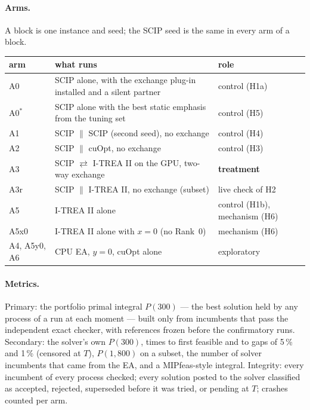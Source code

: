 \paragraph{Arms.} A block is one instance and seed; the SCIP seed is the same in every arm of a block.
\begin{center}\small
\begin{tabular}{lll}
\toprule
arm & what runs & role \\
\midrule
A0 & SCIP alone, with the exchange plug-in installed and a silent partner & control (H1a) \\
A0$^*$ & SCIP alone with the best static emphasis from the tuning set & control (H5) \\
A1 & SCIP $\parallel$ SCIP (second seed), no exchange & control (H4) \\
A2 & SCIP $\parallel$ cuOpt, no exchange & control (H3) \\
A3 & SCIP $\rightleftarrows$ I-TREA II on the GPU, two-way exchange & \textbf{treatment} \\
A3r & SCIP $\parallel$ I-TREA II, no exchange (subset) & live check of H2 \\
A5 & I-TREA II alone & control (H1b), mechanism (H6) \\
A5x0 & I-TREA II alone with $x = 0$ (no Rank~0) & mechanism (H6) \\
A4, A5y0, A6 & CPU EA, $y = 0$, cuOpt alone & exploratory \\
\bottomrule
\end{tabular}
\end{center}

\paragraph{Metrics.} Primary: the portfolio primal integral $P(300)$ --- the best solution held by any process of a run
at each moment --- built only from incumbents that pass the independent exact checker, with references frozen before
the confirmatory runs. Secondary: the solver's own $P(300)$, times to first feasible and to gaps of 5\,\% and 1\,\%
(censored at $T$), $P(1{,}800)$ on a subset, the number of solver incumbents that came from the EA, and a MIPfeas-style
integral. Integrity: every incumbent of every process checked; every solution posted to the solver classified as
accepted, rejected, superseded before it was tried, or pending at $T$; crashes counted per arm.

